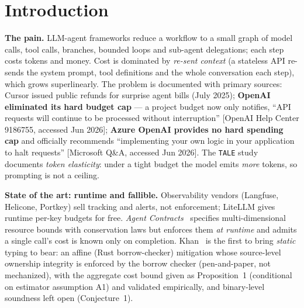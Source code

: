 \documentclass[11pt]{article}
\theoremstyle{plain}
\begin{document}
\begin{abstract}
reasoning tokens are inside \texttt{completion\_tokens}), and Anthropic standard
(\texttt{budget\_tokens} $<$ \texttt{max\_tokens}), but \textbf{degrades} for Anthropic
interleaved/adaptive thinking (budget may exceed \texttt{max\_tokens}) and Gemini when
\texttt{maxOutputTokens} is set without pinning the separate \texttt{thinkingBudget} (\S3.2,
primary docs). Finally, the calculus is realized as \textbf{\texttt{gasket}, an open-source static
checker}, and validated by an \textbf{empirical study of 254 real agent workflows} from 45 public
repositories (\S6): 76\% map onto the calculus and 88\% of cyclic workflows rely on a \emph{framework
default} (often a vacuous 1000-superstep LangGraph limit) for their only budget bound. To our
knowledge this is the \textbf{first Lean-mechanized aggregate cost-soundness theorem specialized to
per-call-capped LLM-agent workflows}; the proof technique is textbook AARA, the contribution is the
instantiation, the provider-billing semantics, and the tool + study.
\end{abstract}

\section{Introduction}

\textbf{The pain.} LLM-agent frameworks reduce a workflow to a small graph of model calls, tool
calls, branches, bounded loops and sub-agent delegations; each step costs tokens and money. Cost is
dominated by \emph{re-sent context} (a stateless API re-sends the system prompt, tool definitions
and the whole conversation each step), which grows superlinearly. The problem is documented with
primary sources: Cursor issued public refunds for surprise agent bills (July 2025); \textbf{OpenAI
eliminated its hard budget cap} --- a project budget now only notifies, ``API requests will
continue to be processed without interruption'' [OpenAI Help Center 9186755, accessed Jun 2026];
\textbf{Azure OpenAI provides no hard spending cap} and officially recommends ``implementing your
own logic in your application to halt requests'' [Microsoft Q\&A, accessed Jun 2026]. The
\texttt{TALE} study~\cite{tale2024} documents \emph{token elasticity}: under a tight budget the
model emits \emph{more} tokens, so prompting is not a ceiling.

\textbf{State of the art: runtime and fallible.} Observability vendors (Langfuse, Helicone,
Portkey) sell tracking and alerts, not enforcement; LiteLLM gives runtime per-key budgets for free.
\emph{Agent Contracts}~\cite{agentcontracts2026} specifies multi-dimensional resource bounds with
conservation laws but enforces them \emph{at runtime} and admits a single call's cost is known only
on completion. Khan~\cite{khan2026} is the first to bring \emph{static} typing to bear: an affine
(Rust borrow-checker) mitigation whose source-level ownership integrity is enforced by the borrow
checker (pen-and-paper, not mechanized), with the aggregate cost bound given as Proposition~1
(conditional on estimator assumption A1) and validated empirically, and binary-level soundness left
open (Conjecture~1).
\end{document}
